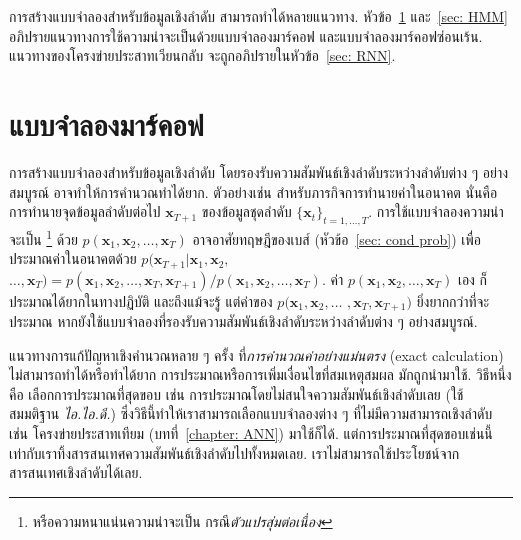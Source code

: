 การสร้างแบบจำลองสำหรับข้อมูลเชิงลำดับ สามารถทำได้หลายแนวทาง.
หัวข้อ~\ref{sec: Markov model} และ~\ref{sec: HMM} อภิปรายแนวทางการใช้ความน่าจะเป็นด้วยแบบจำลองมาร์คอฟ
และแบบจำลองมาร์คอฟซ่อนเร้น. 
แนวทางของโครงข่ายประสาทเวียนกลับ จะถูกอภิปรายในหัวข้อ~\ref{sec: RNN}.

\section{แบบจำลองมาร์คอฟ}
\label{sec: Markov model}

การสร้างแบบจำลองสำหรับข้อมูลเชิงลำดับ
โดยรองรับความสัมพันธ์เชิงลำดับระหว่างลำดับต่าง ๆ อย่างสมบูรณ์
อาจทำให้การคำนวณทำได้ยาก.
ตัวอย่างเช่น 
สำหรับภารกิจการทำนายค่าในอนาคต
นั่นคือ การทำนายจุดข้อมูลลำดับต่อไป $\bm{x}_{T+1}$ ของข้อมูลชุดลำดับ $\{\bm{x}_t\}_{t=1,\ldots, T}$.
การใช้แบบจำลองความน่าจะเป็น%
\footnote{หรือความหนาแน่นความน่าจะเป็น กรณี\textit{ตัวแปรสุ่มต่อเนื่อง}}
ด้วย
$p(\bm{x}_1, \bm{x}_2, \ldots, \bm{x}_T)$ 
อาจอาศัยทฤษฎีของเบส์ (หัวข้อ~\ref{sec: cond prob}) 
เพื่อประมาณค่าในอนาคตด้วย
$p(\bm{x}_{T+1}|\bm{x}_1, \bm{x}_2,$ $\ldots, \bm{x}_T) = p(\bm{x}_1, \bm{x}_2, \ldots, \bm{x}_T, \bm{x}_{T+1})/p(\bm{x}_1, \bm{x}_2, \ldots, \bm{x}_T)$.
ค่า $p(\bm{x}_1, \bm{x}_2, \ldots, \bm{x}_T)$ เอง ก็ประมาณได้ยากในทางปฏิบัติ
และถึงแม้จะรู้ แต่ค่าของ $p(\bm{x}_1, \bm{x}_2, \ldots$ $,\bm{x}_T, \bm{x}_{T+1})$ ยิ่งยากกว่าที่จะประมาณ
หากยังใช้แบบจำลองที่รองรับความสัมพันธ์เชิงลำดับระหว่างลำดับต่าง ๆ อย่างสมบูรณ์.

แนวทางการแก้ปัญหาเชิงคำนวณหลาย ๆ ครั้ง
ที่\textit{การคำนวณค่าอย่างแม่นตรง} (exact calculation) ไม่สามารถทำได้หรือทำได้ยาก
การประมาณหรือการเพิ่มเงื่อนไขที่สมเหตุสมผล มักถูกนำมาใช้.
วิธีหนึ่งคือ เลือกการประมาณที่สุดขอบ เช่น การประมาณโดยไม่สนใจความสัมพันธ์เชิงลำดับเลย (ใช้สมมติฐาน \textit{ไอ.ไอ.ดี.})
ซึ่งวิธีนี้ทำให้เราสามารถเลือกแบบจำลองต่าง ๆ ที่ไม่มีความสามารถเชิงลำดับ เช่น โครงข่ายประสาทเทียม (บทที่~\ref{chapter: ANN}) มาใช้ก็ได้.
แต่การประมาณที่สุดขอบเช่นนี้ เท่ากับเราทิ้งสารสนเทศความสัมพันธ์เชิงลำดับไปทั้งหมดเลย.
เราไม่สามารถใช้ประโยชน์จากสารสนเทศเชิงลำดับได้เลย.

